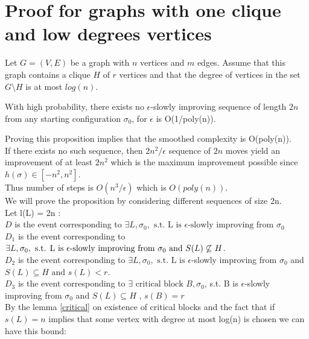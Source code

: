 \section{Proof for graphs with one clique and low degrees vertices}
\label{sec::firstProof}
Let $G = (V,E)$ be a graph with $n$ vertices and $m$ edges. Assume that this graph contains a clique $H$ of $r$ vertices and that the degree of vertices in the set $G \setminus H$ is at most $log(n)$. \\

\begin{proposition}
\label{prop}
With high probability, there exists no $\epsilon$-slowly improving sequence of length $2n$ from any starting configuration $\sigma_0$, for $\epsilon$ is O(1/poly(n)).
\end{proposition}

Proving this proposition implies that the smoothed complexity is O(poly(n)). \\
If there exists no such sequence, then $2n^2/\epsilon$ sequence of $2n$ moves yield an improvement of at least $2n^2$ which is the maximum improvement possible since $h(\sigma) \in [-n^2,n^2]$. \\
Thus number of steps is $O(n^3/\epsilon)$ which is $O(poly(n))$. \\

We will prove the proposition by considering different sequences of size 2n.\\
Let l(L) = 2n : \\
$D$ is the event corresponding to $\exists L, \sigma_0, \text{ s.t. L is }\epsilon\text{-slowly improving from }\sigma_0 $\\
$D_1$ is the event corresponding to $\exists L, \sigma_0, \text{ s.t. L is }\epsilon\text{-slowly improving from }\sigma_0 \\
\text{ and }S(L) \not\subseteq H$.\\
$D_2$ is the event corresponding to $\exists L, \sigma_0,\text{ s.t. L is }\epsilon$-slowly  improving from $\sigma_0$ and $S(L) \subseteq H\text{ and }s(L) < r$. \\
$D_3$   is the event corresponding to $\exists \text{ critical block } B, \sigma_0$, s.t. B is $\epsilon$-slowly improving from $\sigma_0$ and $S(L) \subseteq H \text{ , } s(B) = r $\\
By the lemma \ref{critical} on existence of critical blocks and the fact that if $s(L) = n$ implies that some vertex with degree at most log(n) is chosen we can have this bound:

